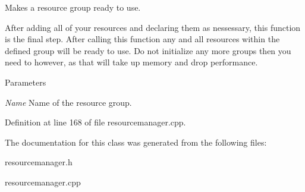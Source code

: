 Makes a resource group ready to use. 

After adding all of your resources and declaring them as nessessary, this function is the final step. After calling this function any and all resources within the defined group will be ready to use. Do not initialize any more groups then you need to however, as that will take up memory and drop performance. 
\begin{DoxyParams}{Parameters}
\item[{\em Name}]Name of the resource group. \end{DoxyParams}


Definition at line 168 of file resourcemanager.cpp.



The documentation for this class was generated from the following files:\begin{DoxyCompactItemize}
\item 
resourcemanager.h\item 
resourcemanager.cpp\end{DoxyCompactItemize}
